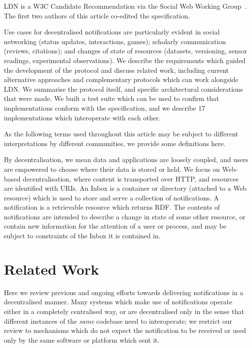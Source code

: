 \documentclass[a4paper]{llncs}
\begin{document}
\par LDN is a W3C \empty Candidate Recommendation via the \empty Social Web Working Group~\cite{ref-4}. The first two authors of this article co-edited the specification.


\par Use cases for decentralised notifications are particularly evident in social networking (status updates, interactions, games); scholarly communication (reviews, citations); and changes of state of resources (datasets, versioning, sensor readings, experimental observations). We describe the requirements which guided the development of the protocol and discuss related work, including current alternative approaches and complementary protocols which can work alongside LDN. We summarise the protocol itself, and specific architectural considerations that were made. We built a test suite which can be used to confirm that implementations conform with the specification, and we describe 17 implementations which interoperate with each other.



\par As the following terms used throughout this article may be subject to different interpretations by different communities, we provide some definitions here.


\par By decentralisation, we mean data and applications are loosely coupled, and users are empowered to choose where their data is stored or held. We focus on Web-based decentralisation, where content is transported over HTTP, and resources are identified with URIs. An Inbox is a container or directory (attached to a Web resource) which is used to store and serve a collection of notifications. A notification is a retrievable resource which returns RDF. The contents of notifications are intended to describe a change in state of some other resource, or contain new information for the attention of a user or process, and may be subject to constraints of the Inbox it is contained in.








                        \section{Related Work}
  \label{related-work}



\par Here we review previous and ongoing efforts towards delivering notifications in a decentralised manner. Many systems which make use of notifications operate either in a completely centralised way, or are decentralised only in the sense that different instances of the {\em same} codebase need to interoperate; we restrict our review to mechanisms which do not expect the notification to be received or used only by the same software or platform which sent it.
\end{document}
